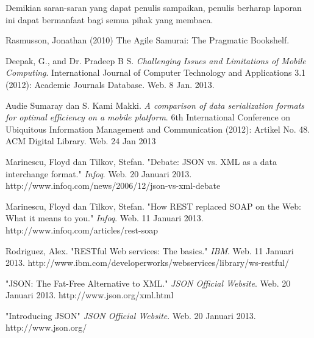 \documentclass{llncs}
\begin{document}
Demikian saran-saran yang dapat penulis sampaikan, penulis berharap laporan ini dapat bermanfaat bagi semua pihak yang membaca.



%
%

\begin{thebibliography}{1}

Rasmusson, Jonathan (2010) The Agile Samurai: The Pragmatic Bookshelf.

Deepak, G., and Dr. Pradeep B S. \emph{Challenging Issues and Limitations of Mobile Computing}. International Journal of Computer Technology and Applications 3.1 (2012): Academic Journals Database. Web. 8 Jan. 2013.

Audie Sumaray dan S. Kami Makki. \emph{A comparison of data serialization formats for optimal efficiency on a mobile platform}. 6th International Conference on Ubiquitous Information Management and Communication (2012): Artikel No. 48. ACM Digital Library. Web. 24 Jan 2013

Marinescu, Floyd dan Tilkov, Stefan. "Debate: JSON vs. XML as a data interchange format." \emph{Infoq}. Web. 20 Januari 2013. http://www.infoq.com/news/2006/12/json-vs-xml-debate

Marinescu, Floyd dan Tilkov, Stefan. "How REST replaced SOAP on the Web: What it means to you." \emph{Infoq}. Web. 11 Januari 2013. http://www.infoq.com/articles/rest-soap

Rodriguez, Alex. "RESTful Web services: The basics." \emph{IBM}. Web. 11 Januari 2013. http://www.ibm.com/developerworks/webservices/library/ws-restful/

"JSON: The Fat-Free Alternative to XML." \emph{JSON Official Website}. Web. 20 Januari 2013. http://www.json.org/xml.html

"Introducing JSON" \emph{JSON Official Website}. Web. 20 Januari 2013. http://www.json.org/
  

\end{thebibliography}
\end{document}
